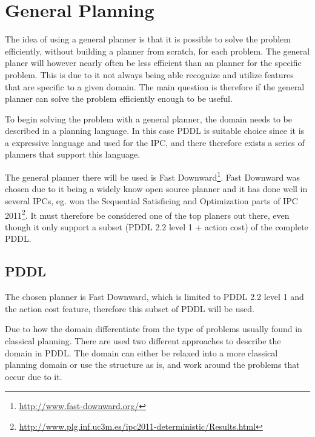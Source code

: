 \chapter{General Planning}
	The idea of using a general planner is that it is possible to solve the problem efficiently, without building a planner from scratch, for each problem. The general planer will however nearly often be less efficient than an planner for the specific problem. This is due to it not always being able recognize and utilize features that are specific to a given domain. The main question is therefore if the general planner can solve the problem efficiently enough to be useful.

	To begin solving the problem with a general planner, the domain needs to be described in a planning language. In this case PDDL is suitable choice since it is a expressive language and used for the IPC, and there therefore exists a series of planners that support this language.
 
	  
	The general planner there will be used is Fast Downward\footnote{\url{http://www.fast-downward.org/}}. Fast Downward was chosen due to it being a widely know open source planner and it has done well in several IPCs, eg. won the Sequential Satisficing and Optimization parts of IPC 2011\footnote{\url{http://www.plg.inf.uc3m.es/ipc2011-deterministic/Results.html}}. It must therefore be considered one of the top planers out there, even though it only support a subset (PDDL 2.2 level 1 + action cost) of the complete PDDL.
 
 \section{PDDL}
	The chosen planner is Fast Downward, which is limited to PDDL 2.2 level 1 and the action cost feature, therefore this subset of PDDL will be used.

	Due to how the domain differentiate from the type of problems usually found in classical planning. There are used two different approaches to describe the domain in PDDL. The domain can either be relaxed into a more classical planning domain or use the structure as is, and work around the problems that occur due to it.
	
